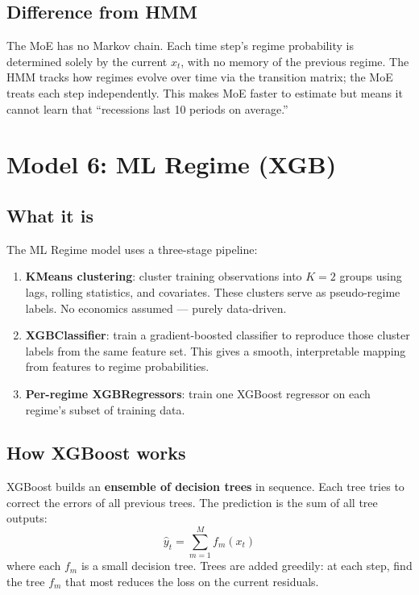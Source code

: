 \documentclass[11pt, a4paper]{article}
\begin{document}
\subsection{Difference from HMM}

The MoE has no Markov chain. Each time step's regime probability is determined
solely by the current $x_t$, with no memory of the previous regime. The HMM
tracks how regimes evolve over time via the transition matrix; the MoE treats
each step independently. This makes MoE faster to estimate but means it cannot
learn that ``recessions last 10 periods on average.''

\section{Model 6: ML Regime (XGB)}

\subsection{What it is}

The ML Regime model uses a three-stage pipeline:
\begin{enumerate}[leftmargin=*, itemsep=3pt]
  \item \textbf{KMeans clustering}: cluster training observations into
        $K=2$ groups using lags, rolling statistics, and covariates. These
        clusters serve as pseudo-regime labels. No economics assumed ---
        purely data-driven.
  \item \textbf{XGBClassifier}: train a gradient-boosted classifier to
        reproduce those cluster labels from the same feature set. This gives
        a smooth, interpretable mapping from features to regime probabilities.
  \item \textbf{Per-regime XGBRegressors}: train one XGBoost regressor on
        each regime's subset of training data.
\end{enumerate}

\subsection{How XGBoost works}

XGBoost builds an \textbf{ensemble of decision trees} in sequence. Each tree
tries to correct the errors of all previous trees. The prediction is the sum of
all tree outputs:
\[
  \hat{y}_t = \sum_{m=1}^M f_m(x_t)
\]
where each $f_m$ is a small decision tree. Trees are added greedily: at each
step, find the tree $f_m$ that most reduces the loss on the current residuals.
\end{document}
